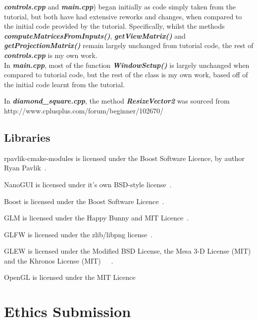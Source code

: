 \documentclass[a4paper,10pt]{report}
\begin{document}
\textit{\textbf{controls.cpp}} and \textit{\textbf{main.cpp}}) began initially as code simply taken from the tutorial, but both have had extensive reworks and changes, when compared to the initial code provided by the tutorial. Specifically, whilst the methods \textit{\textbf{computeMatricesFromInputs()}}, \textit{\textbf{getViewMatrix()}} and \textit{\textbf{getProjectionMatrix()}} remain largely unchanged from tutorial code, the rest of \textit{\textbf{controls.cpp}} is my own work. \\

In \textit{\textbf{main.cpp}}, most of the function \textit{\textbf{WindowSetup()}} is largely unchanged when compared to tutorial code, but the rest of the class is my own work, based off of the initial code learnt from the tutorial. \medskip

In \textit{\textbf{diamond\_square.cpp}}, the method \textit{\textbf{ResizeVector2}} was sourced from http://www.cplusplus.com/forum/beginner/102670/ 

\section{Libraries}

rpavlik-cmake-modules is licensed under the Boost Software Licence, by author Ryan Pavlik~\cite{boostSoftwareLicence}. \medskip

NanoGUI is licensed under it's own BSD-style license~\cite{nanoGUILicence}.\medskip

Boost is licensed under the Boost Software Licence~\cite{boostSoftwareLicence}.\medskip

GLM is licensed under the Happy Bunny and MIT Licence~\cite{bunny}.\medskip

GLFW is licensed under the zlib/libpng license~\cite{zlib}.\medskip

GLEW is licensed under the Modified BSD License, the Mesa 3-D License (MIT) and the Khronos License (MIT)~\cite{GLEWlib}~\cite{mesa3D}~\cite{khronoslicence}. \medskip

OpenGL is licensed under the MIT Licence~\cite{mitlicence}


\chapter{Ethics Submission}
\end{document}
